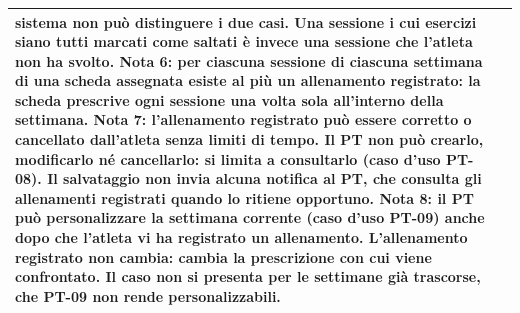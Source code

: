 \documentclass[../../../../SoftwareRequirementsSpecification.tex]{subfiles}
\begin{document}
\begin{tabularx}{\textwidth}{|l|X|}
{    sistema non può distinguere i due casi. Una sessione i cui
    esercizi siano tutti marcati come saltati è invece una sessione
    che l'atleta non ha svolto.\newline
    \textbf{Nota 6:} per ciascuna sessione di ciascuna settimana di
    una scheda assegnata esiste al più un allenamento registrato: la
    scheda prescrive ogni sessione una volta sola all'interno della
    settimana.\newline
    \textbf{Nota 7:} l'allenamento registrato può essere corretto o
    cancellato dall'atleta senza limiti di tempo. Il PT non può
    crearlo, modificarlo né cancellarlo: si limita a consultarlo
    (caso d'uso PT-08). Il salvataggio non invia alcuna notifica al
    PT, che consulta gli allenamenti registrati quando lo ritiene
    opportuno.\newline
    \textbf{Nota 8:} il PT può personalizzare la settimana corrente
    (caso d'uso PT-09) anche dopo che l'atleta vi ha registrato un
    allenamento. L'allenamento registrato non cambia: cambia la
    prescrizione con cui viene confrontato. Il caso non si presenta
    per le settimane già trascorse, che PT-09 non rende
    personalizzabili.
  } \\ \hline
\end{tabularx}
\end{document}
